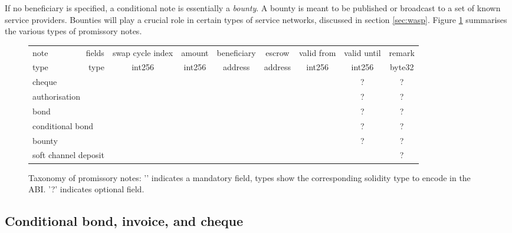 \documentclass[a4paper,10pt]{article}
\newcommand\gloss[1]{\emph{\gls{#1}}}
\begin{document}
If no beneficiary is specified, a conditional note is essentially a \gloss{bounty}.
A bounty is meant to be published or broadcast to a set of known service providers.
Bounties will play a crucial role in certain types of service networks, discussed in section \ref{sec:wasp}.
Figure \ref{fig:taxonomy} summarises the various types of promissory notes.


\newcommand{\tick}{\checkmark}
\newcommand{\opt}{?}
\begin{center}
\begin{figure}
\begin{center}
\begin{tabular}{|l|r||c|c|c|c|c|c|c|}
\hline
note & fields
& swap cycle index
& amount
& beneficiary
& escrow
& valid from
& valid until
& remark
\\
\cline{2-9}

type & type 
& int256
& int256
& address
& address
& int256
& int256
& byte32
\\
\hline
\hline
\multicolumn{2}{|l||}{cheque}   & \tick & \tick & \tick & & & \opt& \opt
\\
\multicolumn{2}{|l||}{authorisation} &  & \tick & \tick & & & \opt& \opt
\\
\multicolumn{2}{|l||}{bond} & \tick & \tick & \tick & & \tick & \opt& \opt
\\
\multicolumn{2}{|l||}{conditional bond} &  & \tick & \tick & \tick & \tick & \opt& \opt
\\
\multicolumn{2}{|l||}{bounty} & \tick &  \tick & & \tick & \tick & \opt& \opt
\\
\multicolumn{2}{|l||}{soft channel deposit} &  \tick & \tick & & & && \opt
\\
\hline
\end{tabular}
\end{center}
\caption{Taxonomy of promissory notes: '\tick' indicates a mandatory field, types show the corresponding solidity type to encode in the ABI. '?' indicates optional field.}
\label{fig:taxonomy}
\end{figure}
\end{center}



\subsection{Conditional bond, invoice, and cheque}
\end{document}
